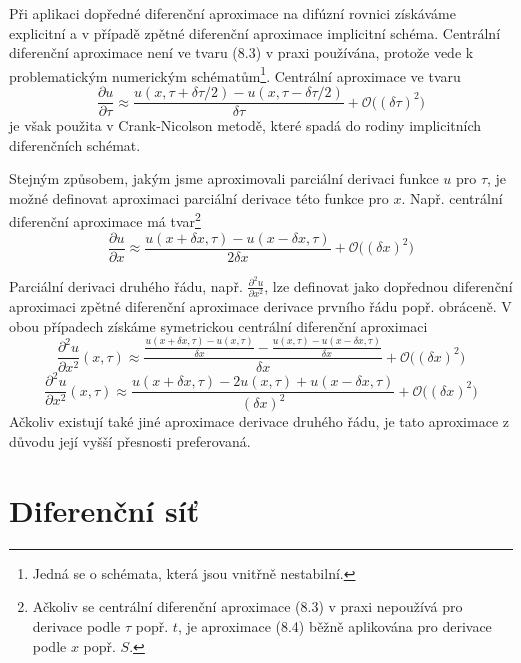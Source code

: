 \documentclass[a4paper]{book}
\begin{document}
Při aplikaci dopředné diferenční aproximace na difúzní rovnici získáváme explicitní a v případě zpětné diferenční aproximace implicitní schéma. Centrální diferenční aproximace není ve tvaru (8.3) v praxi používána, protože vede k problematickým numerickým schématům\footnote{Jedná se o schémata, která jsou vnitřně nestabilní.}. Centrální aproximace ve tvaru
\begin{equation}
\frac{\partial u}{\partial \tau} \approx \frac{u(x, \tau + \delta \tau / 2) - u(x, \tau - \delta \tau / 2)}{\delta \tau} + \mathcal{O}\Big( (\delta \tau)^2 \Big)
\end{equation}
je však použita v Crank-Nicolson metodě, které spadá do rodiny implicitních diferenčních schémat.

Stejným způsobem, jakým jsme aproximovali parciální derivaci funkce $u$ pro $\tau$, je možné definovat aproximaci parciální derivace této funkce pro $x$. Např. centrální diferenční aproximace má tvar\footnote{Ačkoliv se centrální diferenční aproximace (8.3) v praxi nepoužívá pro derivace podle $\tau$ popř. $t$, je aproximace (8.4) běžně aplikována pro derivace podle $x$ popř. $S$.}
\begin{equation*}
\frac{\partial u}{\partial x} \approx \frac{u(x + \delta x, \tau) - u(x - \delta x, \tau)}{2 \delta x} + \mathcal{O} \Big( (\delta x)^2 \Big)
\end{equation*}

 Parciální derivaci druhého řádu, např. $\frac{\partial^2 u}{\partial x^2}$, lze definovat jako dopřednou diferenční aproximaci zpětné diferenční aproximace derivace prvního řádu popř. obráceně. V obou případech získáme symetrickou centrální diferenční aproximaci
\begin{equation*}
\frac{\partial^2 u}{\partial x^2}(x, \tau) \approx \frac{\frac{u(x + \delta x, \tau) - u(x, \tau)}{\delta x} - \frac{u(x, \tau) - u(x - \delta x, \tau)}{\delta x}}{\delta x} + \mathcal{O} \Big( (\delta x)^2 \Big)
\end{equation*}
\begin{equation}
\frac{\partial^2 u}{\partial x^2}(x, \tau) \approx \frac{u(x + \delta x, \tau) - 2u(x, \tau) + u(x - \delta x, \tau)}{(\delta x)^2} + \mathcal{O} \Big( (\delta x)^2 \Big)
\end{equation}
Ačkoliv existují také jiné aproximace derivace druhého řádu, je tato aproximace z důvodu její vyšší přesnosti preferovaná.

\section{Diferenční síť}
\end{document}
